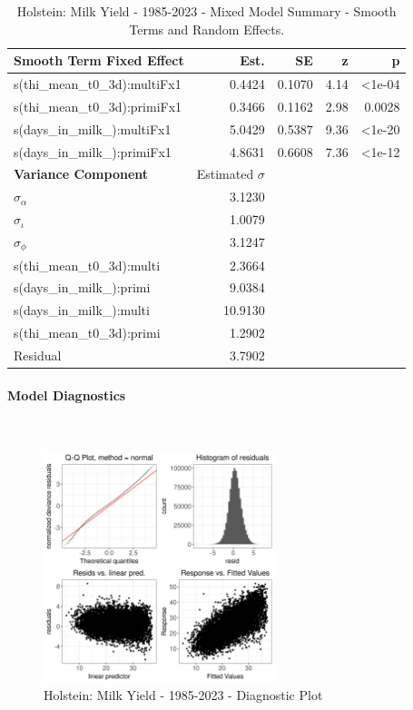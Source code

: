 \newpage
\begin{table}[H]
\centering
\begin{tabular}
{l | r | r | r | r}
\textbf{Smooth Term Fixed Effect} & Est. & SE & z & p\\
\hline
\hline
s(thi\_mean\_t0\_3d):multiFx1 & 0.4424 & 0.1070 & 4.14 & <1e-04\\
s(thi\_mean\_t0\_3d):primiFx1 & 0.3466 & 0.1162 & 2.98 & 0.0028\\
s(days\_in\_milk\_):multiFx1 & 5.0429 & 0.5387 & 9.36 & <1e-20\\
s(days\_in\_milk\_):primiFx1 & 4.8631 & 0.6608 & 7.36 & <1e-12\\
\hline
\textbf{Variance Component} & Estimated $\sigma$ & & & \\
\hline
\hline
$\sigma_\alpha$ & 3.1230 & &  & \\
$\sigma_\iota$ & 1.0079 & & & \\
$\sigma_\phi$ & 3.1247 & & & \\
s(thi\_mean\_t0\_3d):multi & 2.3664 & & & \\
s(days\_in\_milk\_):primi & 9.0384 & & & \\
s(days\_in\_milk\_):multi & 10.9130 & & & \\
s(thi\_mean\_t0\_3d):primi & 1.2902 & & & \\
Residual & 3.7902 & & & \\
\end{tabular}
\caption[]{Holstein: Milk Yield - 1985-2023 - Mixed Model Summary - Smooth Terms and Random Effects.}
\end{table}

\paragraph{Model Diagnostics} \quad \\
\begin{figure}[H]
    \centering
    \includegraphics[width=0.6\textwidth]{thesis/figures/models/milk/full/ho_milk_full/ho_milk_full_diagnostics.png}
    \caption[]{Holstein: Milk Yield - 1985-2023 - Diagnostic Plot}
\end{figure}

